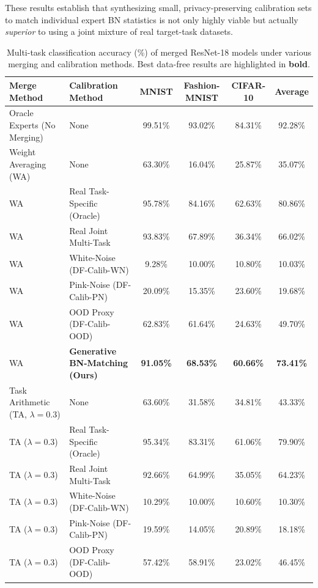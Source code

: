 \documentclass{article}
\theoremstyle{plain}
\theoremstyle{definition}
\theoremstyle{remark}
\begin{document}
These results establish that synthesizing small, privacy-preserving calibration sets to match individual expert BN statistics is not only highly viable but actually \emph{superior} to using a joint mixture of real target-task datasets.

\begin{table}[t]
\caption{Multi-task classification accuracy (\%) of merged ResNet-18 models under various merging and calibration methods. Best data-free results are highlighted in \textbf{bold}.}
\label{tab:main_results}
\vskip 0.15in
\begin{center}
\begin{small}
\setlength{\tabcolsep}{5pt}
\begin{tabular}{llcccc}
\toprule
\textbf{Merge Method} & \textbf{Calibration Method} & \textbf{MNIST} & \textbf{Fashion-MNIST} & \textbf{CIFAR-10} & \textbf{Average} \\
\midrule
Oracle Experts (No Merging) & None & 99.51\% & 93.02\% & 84.31\% & 92.28\% \\
\midrule
Weight Averaging (WA) & None & 63.30\% & 16.04\% & 25.87\% & 35.07\% \\
WA & Real Task-Specific (Oracle) & 95.78\% & 84.16\% & 62.63\% & 80.86\% \\
WA & Real Joint Multi-Task & 93.83\% & 67.89\% & 36.34\% & 66.02\% \\
WA & White-Noise (DF-Calib-WN) & 9.28\% & 10.00\% & 10.80\% & 10.03\% \\
WA & Pink-Noise (DF-Calib-PN) & 20.09\% & 15.35\% & 23.60\% & 19.68\% \\
WA & OOD Proxy (DF-Calib-OOD) & 62.83\% & 61.64\% & 24.63\% & 49.70\% \\
WA & \textbf{Generative BN-Matching (Ours)} & \textbf{91.05\%} & \textbf{68.53\%} & \textbf{60.66\%} & \textbf{73.41\%} \\
\midrule
Task Arithmetic (TA, $\lambda=0.3$) & None & 63.60\% & 31.58\% & 34.81\% & 43.33\% \\
TA ($\lambda=0.3$) & Real Task-Specific (Oracle) & 95.34\% & 83.31\% & 61.06\% & 79.90\% \\
TA ($\lambda=0.3$) & Real Joint Multi-Task & 92.66\% & 64.99\% & 35.05\% & 64.23\% \\
TA ($\lambda=0.3$) & White-Noise (DF-Calib-WN) & 10.29\% & 10.00\% & 10.60\% & 10.30\% \\
TA ($\lambda=0.3$) & Pink-Noise (DF-Calib-PN) & 19.59\% & 14.05\% & 20.89\% & 18.18\% \\
TA ($\lambda=0.3$) & OOD Proxy (DF-Calib-OOD) & 57.42\% & 58.91\% & 23.02\% & 46.45\% \\

\end{tabular}
\end{small}
\end{center}
\end{table}
\end{document}
